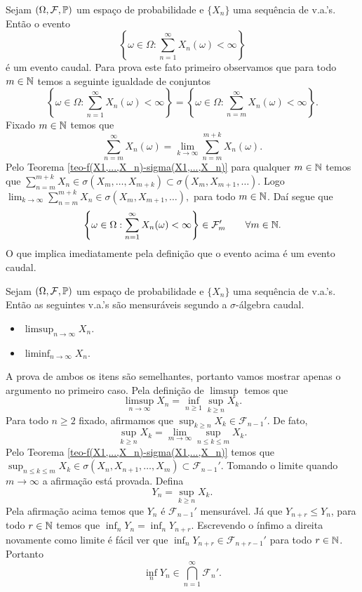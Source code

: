 \begin{exemplo}
	Sejam $(\Omega,\mathcal{F},\mathbb{P})$ um espaço de probabilidade e
	$\{X_n\}$ uma sequência de v.a.'s. Então o evento 
		\[
			\left\{
			\omega\in \Omega: \sum_{n=1}^{\infty} X_n(\omega)<\infty
			\right\}
		\]
	é um evento caudal.
	Para prova este fato primeiro observamos 
	que para todo $m\in\mathbb{N}$ temos a seguinte 
	igualdade de conjuntos 
		\[
			\left\{
			\omega\in \Omega: \sum_{n=1}^{\infty} X_n(\omega)<\infty
			\right\}
			=
			\left\{
			\omega\in \Omega: \sum_{n=m}^{\infty} X_n(\omega)<\infty
			\right\}.
		\]
	Fixado $m\in \mathbb{N}$ temos que 
		\[
		\sum_{n=m}^{\infty} X_n(\omega)
		=
		\lim_{k\to\infty} \sum_{n=m}^{m+k} X_n(\omega).
		\]
	Pelo Teorema \ref{teo-f(X1,...,X_n)-sigma(X1,...,X_n)}
	para qualquer $m\in\mathbb{N}$ 
	temos que $\sum_{n=m}^{m+k} X_n \in \sigma(X_{m},\ldots,X_{m+k})
	\subset \sigma(X_{m},X_{m+1},\ldots)$. 
	Logo
	$
	\lim_{k\to\infty}\sum_{n=m}^{m+k} X_n
	\in
	\sigma(X_{m},X_{m+1},\ldots),
	$
	para todo $m\in \mathbb{N}$. 
	Daí segue que 
		\[
			\left\{
			\omega\in \Omega: \sum_{n=1}^{\infty} X_n(\omega)<\infty
			\right\}
			\in
			\mathcal{F}_m'
			\qquad
			\forall m\in\mathbb{N}.			
		\]
	O que implica imediatamente pela definição que o evento acima
	é um evento caudal.
\end{exemplo}


\begin{exemplo}
	Sejam $(\Omega,\mathcal{F},\mathbb{P})$ um espaço de probabilidade e
	$\{X_n\}$ uma sequência de v.a.'s. Então as seguintes
	v.a.'s são mensuráveis segundo a $\sigma$-álgebra caudal. 
		\begin{itemize}
			\item 
			$\displaystyle \limsup_{n\to\infty} X_n$.
			
			\item
			$\displaystyle \liminf_{n\to\infty} X_n$.
		\end{itemize}		 

A prova de ambos os itens são semelhantes, portanto vamos 
mostrar apenas o argumento no primeiro caso.  
Pela definição de $\limsup$ temos que 
		\[
			\limsup_{n\to\infty} X_n
			=
			\inf_{n\geq 1} \sup_{k\geq n} X_k.
		\]
Para todo $n\geq 2$ fixado, 
afirmamos que $\sup_{k\geq n} X_k\in \mathcal{F}_{n-1}'$.
De fato,  
\[
	\sup_{k\geq n} X_k  
	= 
	\lim_{m\to\infty} \sup_{n\leq k\leq m} X_k.
\]
Pelo Teorema \ref{teo-f(X1,...,X_n)-sigma(X1,...,X_n)} 
temos que  
$\sup_{n\leq k\leq m} X_k
\in 
\sigma(X_n,X_{n+1},\ldots,X_{m})
\subset
\mathcal{F}_{n-1}'$.
Tomando o limite quando $m\to\infty$ a afirmação está provada. 
Defina 
	\[
		Y_{n} = \sup_{k\geq n} X_k.
	\]
Pela afirmação acima temos que $Y_n$ é $\mathcal{F}_{n-1}'$ mensurável.
Já que  $Y_{n+r}\leq Y_n$, para todo $r\in\mathbb{N}$ temos que 
$\inf_{n} Y_{n} = \inf_{n} Y_{n+r}$. Escrevendo o ínfimo 
a direita novamente como limite é fácil ver que 
$\inf_{n} Y_{n+r}\in \mathcal{F}_{n+r-1}'$ para todo 
$r\in\mathbb{N}$. Portanto 
	\[
		\inf_{n} Y_{n}\in 
		\bigcap_{n=1}^{\infty}
		\mathcal{F}_{n}'.
	\]
\end{exemplo}







